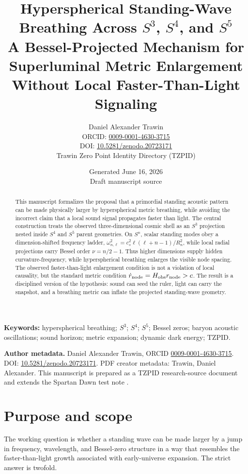 \documentclass[11pt]{article}
\title{\textbf{Hyperspherical Standing-Wave Breathing Across $S^3$, $S^4$, and $S^5$}\\
\large A Bessel-Projected Mechanism for Superluminal Metric Enlargement Without Local Faster-Than-Light Signaling}
\author{Daniel Alexander Trawin\\
\small ORCID: \href{https://orcid.org/0009-0001-4630-3715}{0009-0001-4630-3715}\\
\small DOI: \href{https://doi.org/10.5281/zenodo.20723171}{10.5281/zenodo.20723171}\\
\small Trawin Zero Point Identity Directory (TZPID)}
\date{Generated June 16, 2026\\Draft manuscript source}
\begin{document}
\maketitle

\begin{abstract}
This manuscript formalizes the proposal that a primordial standing acoustic pattern can be made physically larger by hyperspherical metric breathing, while avoiding the incorrect claim that a local sound signal propagates faster than light.  The central construction treats the observed three-dimensional cosmic shell as an $S^3$ projection nested inside $S^4$ and $S^5$ parent geometries.  On $S^n$, scalar standing modes obey a dimension-shifted frequency ladder, $\omega_{n,\ell}^2 = c_s^2\ell(\ell+n-1)/R_n^2$, while local radial projections carry Bessel order $\nu=n/2-1$.  Thus higher dimensions supply hidden curvature-frequency, while hyperspherical breathing enlarges the visible node spacing.  The observed faster-than-light enlargement condition is not a violation of local causality, but the standard metric condition $\dot r_{\rm node}=H_{\rm obs}r_{\rm node}>c$.  The result is a disciplined version of the hypothesis: sound can seed the ruler, light can carry the snapshot, and a breathing metric can inflate the projected standing-wave geometry.
\end{abstract}

\noindent\textbf{Keywords:} hyperspherical breathing; $S^3$; $S^4$; $S^5$; Bessel zeros; baryon acoustic oscillations; sound horizon; metric expansion; dynamic dark energy; TZPID.

\vspace{0.75em}
\noindent\textbf{Author metadata.}
Daniel Alexander Trawin, ORCID \href{https://orcid.org/0009-0001-4630-3715}{0009-0001-4630-3715}.  DOI: \href{https://doi.org/10.5281/zenodo.20723171}{10.5281/zenodo.20723171}.  PDF creator metadata: Trawin, Daniel Alexander.  This manuscript is prepared as a TZPID research-source document and extends the Spartan Dawn test note \citep{TrawinSpartanDawn2026}.

\tableofcontents
\newpage

\section{Purpose and scope}

The working question is whether a standing wave can be made larger by a jump in frequency, wavelength, and Bessel-zero structure in a way that resembles the faster-than-light growth associated with early-universe expansion.  The strict answer is twofold.
\end{document}
